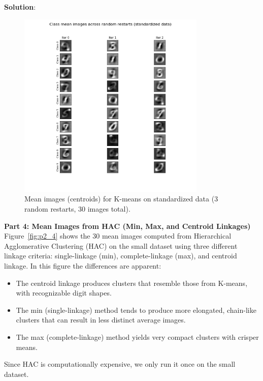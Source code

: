 \documentclass[submit]{../harvardml}
\newenvironment{solution}{
    \vspace{2mm}
    \color{blue}\noindent\textbf{Solution}:
}{}
\begin{document}
\begin{solution}
\begin{figure}[h!]
  \centering
  \includegraphics[width=0.8\textwidth]{img_output/p2.3.png}
  \caption{Mean images (centroids) for K-means on standardized data (3 random restarts, 30 images total).}
  \label{fig:p2_3}
\end{figure}

\medskip
\textbf{Part 4: Mean Images from HAC (Min, Max, and Centroid Linkages)}\\
Figure~\ref{fig:p2_4} shows the 30 mean images computed from Hierarchical Agglomerative Clustering (HAC) on the small dataset using three different linkage criteria: single-linkage (min), complete-linkage (max), and centroid linkage. In this figure the differences are apparent:
\begin{itemize}
  \item The centroid linkage produces clusters that resemble those from K-means, with recognizable digit shapes.
  \item The min (single-linkage) method tends to produce more elongated, chain-like clusters that can result in less distinct average images.
  \item The max (complete-linkage) method yields very compact clusters with crisper means.
\end{itemize}
Since HAC is computationally expensive, we only run it once on the small dataset.


\end{solution}
\end{document}
